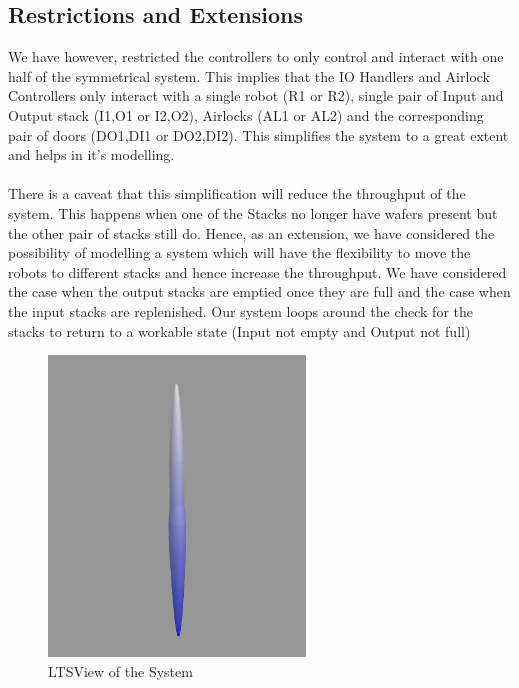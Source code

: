 \documentclass[a4paper,12pt]{article}
\begin{document}
	\subsection{Restrictions and Extensions}
	We have however, restricted the controllers to only control and interact with one half of the symmetrical system. This implies that the IO Handlers and Airlock Controllers only interact with a single robot (R1 or R2), single pair of Input and Output stack (I1,O1 or I2,O2), Airlocks (AL1 or AL2) and the corresponding pair of doors (DO1,DI1 or DO2,DI2). This simplifies the system to a great extent and helps in it's modelling.
	\\
	\\There is a caveat that this simplification will reduce the throughput of the system. This happens when one of the Stacks no longer have wafers present but the other pair of stacks still do. Hence, as an extension, we have considered the possibility of modelling a system which will have the flexibility to move the robots to different stacks and hence increase the throughput. 
	We have considered the case when the output stacks are emptied once they are full and the case when the input stacks are replenished. Our system loops around the check for the stacks to return to a workable state (Input not empty and Output not full)
	\begin{figure}[ht]
		\centering
		\includegraphics[width=\textwidth, height=8cm]{3D-Model.png}
		\caption{LTSView of the System}
		\label{fig:ltsview}
	\end{figure}
	\newpage
\end{document}
